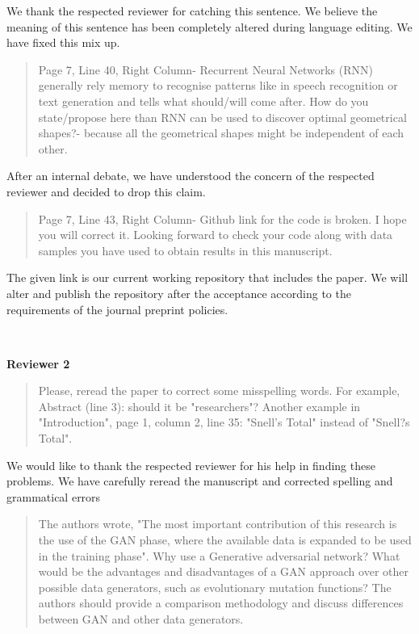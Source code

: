\documentclass{article}
\begin{document}
	We thank the respected reviewer for catching this sentence. We believe the meaning of this sentence has been completely altered during language editing. We have fixed this mix up. 
	
	\begin{quote}
	Page 7, Line 40, Right Column- Recurrent Neural Networks (RNN) generally rely memory to recognise patterns like in speech recognition or text generation and tells what should/will come after. How do you state/propose here than RNN can be used to discover optimal geometrical shapes?- because all the geometrical shapes might be independent of each other.
	\end{quote}
	
	After an internal debate, we have understood the concern of the respected reviewer and decided to drop this claim.
	
	\begin{quote}
	Page 7, Line 43, Right Column- Github link for the code is broken. I hope you will correct it. Looking forward to check your code along with data samples you have used  to obtain results in this manuscript.
	\end{quote}
	
	The given link is our current working repository that includes the paper. We will alter and publish the repository after the acceptance according to the requirements of the journal preprint policies.
	
	~
	
	{\bfseries\large Reviewer 2}
	
	\begin{quote}
	 Please, reread the paper to correct some misspelling words. For example, Abstract (line 3): should it be "researchers"? Another example in "Introduction", page 1, column 2, line 35: "Snell's Total" instead of "Snell?s Total".
	\end{quote}
	
	We would like to thank the respected reviewer for his help in finding these problems. We have carefully reread the manuscript and corrected spelling and grammatical errors
	
	\begin{quote}
	The authors wrote, "The most important contribution of this research is the use of the GAN phase, where the available data is expanded to be used in the training phase". Why use a Generative adversarial network? What would be the advantages and disadvantages of a GAN approach over other possible data generators, such as evolutionary mutation functions? The authors should provide a comparison methodology and discuss differences between GAN and other data generators.
	\end{quote}
	
\end{document}
